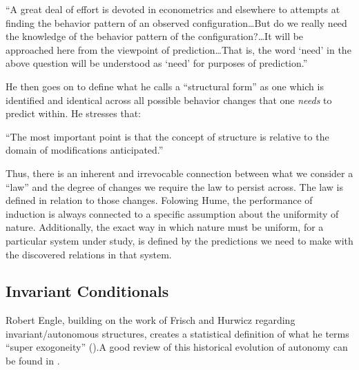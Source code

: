 \documentclass[a4paper,12pt]{article}
\begin{document}
\begin{displayquote}
``A great deal of effort is devoted in econometrics and elsewhere to attempts at finding the behavior pattern of an observed configuration\ldots But do we really need the knowledge of the behavior pattern of the configuration?\ldots It will be approached here from the viewpoint of prediction\ldots That is, the word `need' in the above question will be understood as `need' for purposes of prediction.''
\end{displayquote}


He then goes on to define what he calls a ``structural form'' as one which is identified and identical across all possible behavior changes that one \textit{needs} to predict within. He stresses that:

\begin{displayquote}
``The most important point is that the concept of structure is relative to the domain of modifications anticipated.''
\end{displayquote}

Thus, there is an inherent and irrevocable connection between what we consider a ``law'' and the degree of changes we require the law to persist across. The law is defined in relation to those changes. Folowing Hume, the performance of induction is always connected to a specific assumption about the uniformity of nature. Additionally, the exact way in which nature must be uniform, for a particular system under study, is defined by the predictions we need to make with the discovered relations in that system.


\subsection{Invariant Conditionals}

Robert Engle, building on the work of Frisch and Hurwicz regarding invariant/autonomous structures, creates a statistical definition of what he terms ``super exogoneity'' (\cite{Engle1983}).A good review of this historical evolution of autonomy can be found in \cite{Aldrich1989}.
\end{document}
